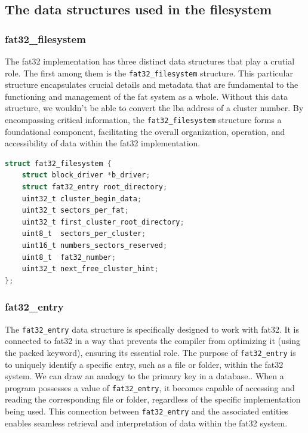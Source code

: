 \subsection{The data structures used in the filesystem}

\subsubsection{fat32\_filesystem}

The fat32 implementation has three distinct data structures that play a crutial role. The first among them is the \texttt{fat32\_filesystem} structure. This particular structure encapsulates crucial details and metadata that are fundamental to the functioning and management of the fat system as a whole. Without this data structure, we wouldn't be able to convert the lba address of a cluster number. By encompassing critical information, the \texttt{fat32\_filesystem} structure forms a foundational component, facilitating the overall organization, operation, and accessibility of data within the fat32 implementation.

\begin{lstlisting}[caption={fat32\_filesystem},captionpos=b,language=C,frame=single,breaklines]
struct fat32_filesystem {
    struct block_driver *b_driver;
    struct fat32_entry root_directory;
    uint32_t cluster_begin_data;
    uint32_t sectors_per_fat;
    uint32_t first_cluster_root_directory;
    uint8_t  sectors_per_cluster;
    uint16_t numbers_sectors_reserved;
    uint8_t  fat32_number;
    uint32_t next_free_cluster_hint;
};
\end{lstlisting}

\subsubsection{fat32\_entry}

The \texttt{fat32\_entry} data structure is specifically designed to work with fat32. It is connected to fat32 in a way that prevents the compiler from optimizing it (using the packed keyword), ensuring its essential role. The purpose of \texttt{fat32\_entry} is to uniquely identify a specific entry, such as a file or folder, within the fat32 system. We can draw an analogy to the primary key in a database.. When a program possesses a value of \texttt{fat32\_entry}, it becomes capable of accessing and reading the corresponding file or folder, regardless of the specific implementation being used. This connection between \texttt{fat32\_entry} and the associated entities enables seamless retrieval and interpretation of data within the fat32 system.

